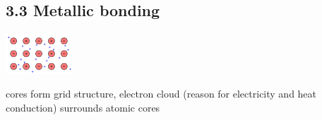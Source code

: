 \subsection{3.3 Metallic bonding}
    \begin{minipage}{25mm}
        \includegraphics[width=2.5cm]{src/3_Chemical_bondings/images/Metallische Bindung.png}
    \end{minipage}
    \begin{minipage}{42mm}
        cores form grid structure, electron cloud (reason for electricity and heat conduction) surrounds atomic cores
    \end{minipage}